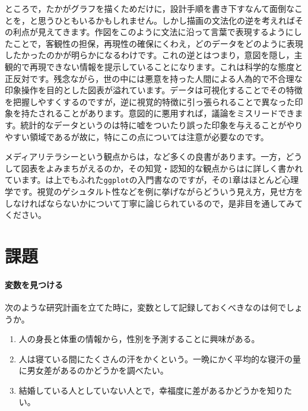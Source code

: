 \documentclass{ltjsbook}
\begin{document}
ところで，たかがグラフを描くためだけに，設計手順を書き下すなんて面倒なことを，と思うひともいるかもしれません。しかし描画の文法化の逆を考えればその利点が見えてきます。作図をこのように文法に沿って言葉で表現するようにしたことで，客観性の担保，再現性の確保にくわえ，どのデータをどのように表現したかったのかが明らかになるわけです。これの逆とはつまり，意図を隠し，主観的で再現できない情報を提示していることになります。これは科学的な態度と正反対です。残念ながら，世の中には悪意を持った人間による人為的で不合理な印象操作を目的とした図表が溢れています。データは可視化することでその特徴を把握しやすくするのですが，逆に視覚的特徴に引っ張られることで異なった印象を持たされることがあります。意図的に悪用すれば，議論をミスリードできます。統計的なデータというのは特に嘘をついたり誤った印象を与えることがやりやすい領域であるが故に，特にこの点については注意が必要なのです。

メディアリテラシーという観点からは，\citet{高木196807}など多くの良書があります。一方，どうして図表をよみまちがえるのか，その知覚・認知的な観点からは\citet{Kieran2018}に詳しく書かれています。\citet{Kieran2018}は上でもふれた\texttt{ggplot}の入門書なのですが，その1章はほとんど心理学です。視覚のゲシュタルト性などを例に挙げながらどういう見え方，見せ方をしなければならないかについて丁寧に論じられているので，是非目を通してみてください。

\section{課題}
\paragraph{変数を見つける}次のような研究計画を立てた時に，変数として記録しておくべきなのは何でしょうか。
\begin{enumerate}
    \item 人の身長と体重の情報から，性別を予測することに興味がある。
    \item 人は寝ている間にたくさんの汗をかくという。一晩にかく平均的な寝汗の量に男女差があるのかどうかを調べたい。
    \item 結婚している人としていない人とで，幸福度に差があるかどうかを知りたい。
\end{enumerate}
\end{document}
